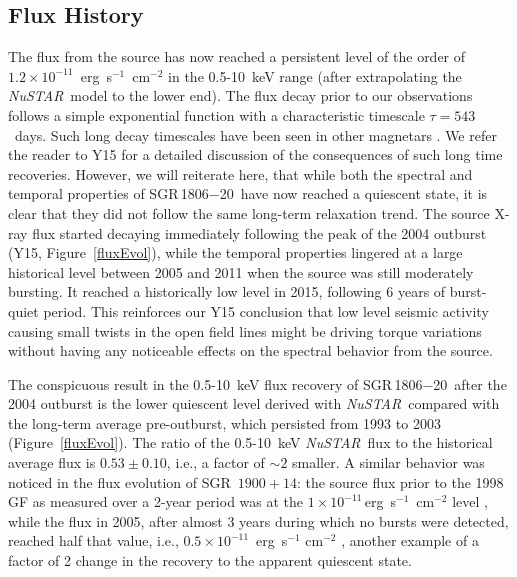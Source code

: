 \documentclass[twocolumn]{aastex6}
\newcommand {\nustar} {\textsl{NuSTAR}}
\def \src {SGR\,1806$-$20}
\begin{document}
\subsection{Flux History}

The flux from the source has now reached a persistent level of the
order of $1.2\times10^{-11}$~erg~s$^{-1}$~cm$^{-2}$ in the 0.5-10~keV
range (after extrapolating the \nustar\ model to the lower end). The
flux decay prior to our observations follows a simple exponential
function with a characteristic timescale $\tau=543$~days. Such long
decay timescales have been seen in other magnetars
\citep[e.g.,][]{scholz14ApJ:1822,zelati17MNRAS:1745,alford16ApJ:1810}. We
refer the reader to Y15 for a detailed discussion of the
consequences of such long time recoveries. However, we will reiterate
here, that while both the spectral and temporal properties of \src\
have now reached a quiescent state, it is clear that they did not
follow the same long-term relaxation trend. The source X-ray flux
started decaying immediately following the peak of the 2004 outburst
(Y15, Figure~\ref{fluxEvol}), while the temporal properties lingered
at a large historical level between 2005 and 2011 when the source was
still moderately bursting. It reached a historically low level in
2015, following 6 years of burst-quiet period. This reinforces our Y15
conclusion that low level seismic activity causing small twists in the 
open field lines might be driving torque variations without having any
noticeable effects on the spectral behavior from the source.

The conspicuous result in the 0.5-10~keV flux recovery of \src\ after
the 2004 outburst is the lower quiescent level derived with \nustar\
compared with the long-term average pre-outburst, which persisted from
1993 to 2003 (Figure~\ref{fluxEvol}). The ratio of the 0.5-10~keV
\nustar\ flux to the historical average flux is $0.53\pm0.10$, i.e., a
factor of $\sim2$ smaller. A similar behavior was noticed in the flux
evolution of SGR~$1900+14$: the source flux prior to the 1998 GF as
measured over a 2-year period was at the
$1\times10^{-11}$\,erg~s$^{-1}$~cm$^{-2}$ level \citep{
  woods01ApJ:1900}, while the flux in 2005, after almost 3 years
during which no bursts were detected, reached half that value, i.e.,
$0.5\times10^{-11}$~erg~s$^{-1}$ cm$^{-2}$ \citep{
  mereghetti06ApJ:1900}, another example of a factor of 2 change in
the recovery to the apparent quiescent state.
\end{document}
